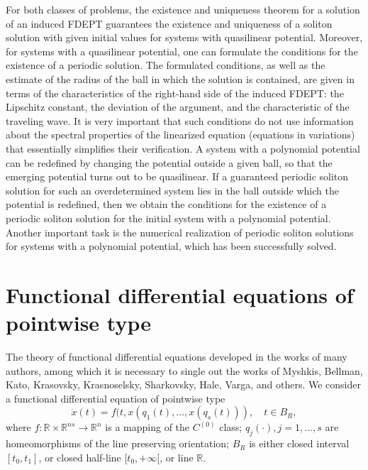 \documentclass[
11pt,%
tightenlines,%
twoside,%
onecolumn,%
nofloats,%
nobibnotes,%
nofootinbib,%
superscriptaddress,%
noshowpacs,%
centertags,aps]%
{revtex4}
\begin{document}
For both classes of problems, the existence and uniqueness theorem for a solution of an induced FDEPT \cite{Beklaryan.2007} guarantees the existence and uniqueness of a soliton solution with given initial values for systems with quasilinear potential. Moreover, for systems with a quasilinear potential, one can formulate the conditions for the existence of a periodic solution. The formulated conditions, as well as the estimate of the radius of the ball in which the solution is contained, are given in terms of the characteristics of the right-hand side of the induced FDEPT: the Lipschitz constant, the deviation of the argument, and the characteristic of the traveling wave. It is very important that such conditions do not use information about the spectral properties of the linearized equation (equations in variations) that essentially simplifies their verification. A system with a polynomial potential can be redefined by changing the potential outside a given ball, so that the emerging potential turns out to be quasilinear. If a guaranteed periodic soliton solution for such an overdetermined system lies in the ball outside which the potential is redefined, then we obtain the conditions for the existence of a periodic soliton solution for the initial system with a polynomial potential. Another important task is the numerical realization of periodic soliton solutions for systems with a polynomial potential, which has been successfully solved.

\section{Functional differential equations of pointwise type}
The theory of functional differential equations developed in the works of many authors, among which it is necessary to single out the works of Myshkis, Bellman, Kato, Krasovsky, Krasnoselsky, Sharkovsky, Hale, Varga, and others. We consider a functional differential equation of pointwise type
\begin{equation}
\label{eq:fdept}
\dot x(t)=f(t,x(q_1(t),\ldots,x(q_s(t))),\quad t\in B_R,
\end{equation}
where $f:\mathbb R\times \mathbb R^{ns}\longrightarrow \mathbb R^n$ is a mapping of the $C^{(0)}$ class; $q_j(\cdot), j=1,\ldots,s$ are homeomorphisms of the line preserving orientation; $B_R$ is either closed interval $[t_0,t_1]$, or closed half-line $[t_0,+\infty[$, or line $\mathbb R$.
\end{document}
